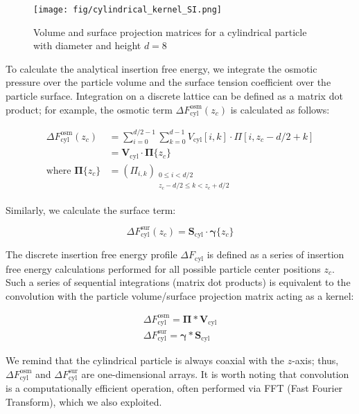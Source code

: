 \documentclass[10pt, a4paper]{article}
\begin{document}
\begin{multicols}{2}
\begin{figure}[H]
    \centering
    \texttt{[image: fig/cylindrical\_kernel\_SI.png]}
    \caption{Volume and surface projection matrices for a cylindrical particle with diameter and height $d = 8$}
    \label{fig:cylindrical_kernel_SI}
\end{figure}

To calculate the analytical insertion free energy, we integrate the osmotic pressure over the particle volume and the surface tension coefficient over the particle surface.
Integration on a discrete lattice can be defined as a matrix dot product; for example, the osmotic term $\Delta F_{\text{cyl}}^{\text{osm}}(z_c)$ is calculated as follows:

\begin{equation}\label{eq:cyl_fe_osm}
    \begin{split}
        \Delta F_{\text{cyl}}^{\text{osm}}(z_c) &= \sum_{i=0}^{d/2 - 1} \sum_{k=0}^{d - 1} V_{\text{cyl}}[i, k] \cdot \Pi[i, z_c - d/2 + k] \\
        &= \mathbf{V}_{\text{cyl}} \cdot \boldsymbol{\Pi}\{z_c\} \\
        \text{where } \boldsymbol{\Pi}\{z_c\} &= \left( \Pi_{i, k} \right)_{\substack{0 \leq i < d/2 \\ z_c - d/2 \leq k < z_c + d/2}}
    \end{split}
\end{equation}

Similarly, we calculate the surface term:

\begin{equation}\label{eq:cyl_fe_sur}
    \Delta F_{\text{cyl}}^{\text{sur}}(z_c) = \mathbf{S}_{\text{cyl}} \cdot \boldsymbol{\gamma}\{z_c\}
\end{equation}

The discrete insertion free energy profile $\Delta F_{\text{cyl}}$ is defined as a series of insertion free energy calculations performed for all possible particle center positions $z_c$.
Such a series of sequential integrations (matrix dot products) is equivalent to the convolution with the particle volume/surface projection matrix acting as a kernel:

\begin{eqnarray}
    \Delta F_{\text{cyl}}^{\text{osm}} = \boldsymbol{\Pi} \ast \mathbf{V}_{\text{cyl}} \\
    \Delta F_{\text{cyl}}^{\text{sur}} = \boldsymbol{\gamma} \ast \mathbf{S}_{\text{cyl}}
\end{eqnarray}

We remind that the cylindrical particle is always coaxial with the $z$-axis; thus, $\Delta F_{\text{cyl}}^{\text{osm}}$ and $\Delta F_{\text{cyl}}^{\text{sur}}$ are one-dimensional arrays.
It is worth noting that convolution is a computationally efficient operation, often performed via FFT (Fast Fourier Transform), which we also exploited.

\end{multicols}
\end{document}
